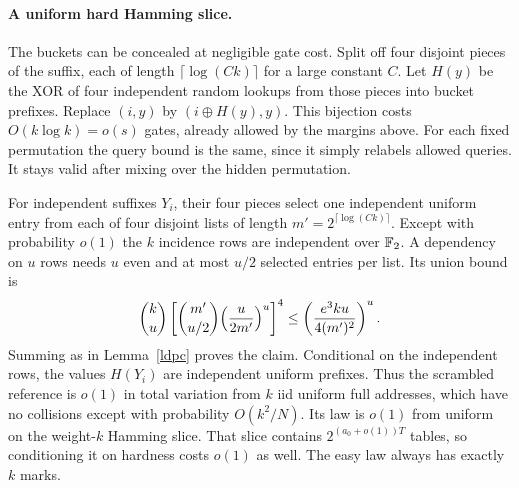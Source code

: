 \documentclass[11pt]{article}
\begin{document}
\paragraph{A uniform hard Hamming slice.} The buckets can be concealed at negligible gate cost. Split off four disjoint pieces of the suffix, each of length $\lceil\log(Ck)\rceil$ for a large constant $C$. Let $H(y)$ be the XOR of four independent random lookups from those pieces into bucket prefixes. Replace $(i,y)$ by $(i\oplus H(y),y)$. This bijection costs $O(k\log k)=o(s)$ gates, already allowed by the margins above. For each fixed permutation the query bound is the same, since it simply relabels allowed queries. It stays valid after mixing over the hidden permutation.

For independent suffixes $Y_i$, their four pieces select one independent uniform entry from each of four disjoint lists of length $m'=2^{\lceil\log(Ck)\rceil}$. Except with probability $o(1)$ the $k$ incidence rows are independent over $\mathbb F_2$. A dependency on $u$ rows needs $u$ even and at most $u/2$ selected entries per list. Its union bound is
\[
 \binom ku\left[\binom{m'}{u/2}\Bigl(\frac{u}{2m'}\Bigr)^u\right]^4
 \le \left(\frac{e^3ku}{4(m')^2}\right)^u.
\]
Summing as in Lemma~\ref{ldpc} proves the claim. Conditional on the independent rows, the values $H(Y_i)$ are independent uniform prefixes. Thus the scrambled reference is $o(1)$ in total variation from $k$ iid uniform full addresses, which have no collisions except with probability $O(k^2/N)$. Its law is $o(1)$ from uniform on the weight-$k$ Hamming slice. That slice contains $2^{(a_0+o(1))T}$ tables, so conditioning it on hardness costs $o(1)$ as well. The easy law always has exactly $k$ marks.
\end{document}
